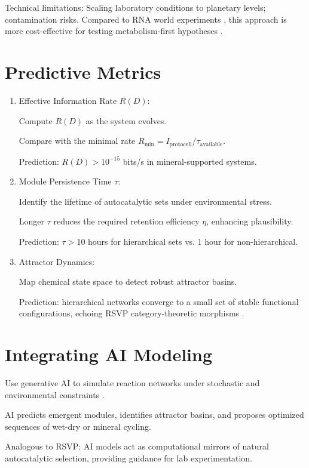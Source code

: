 \documentclass{book}
\begin{document}
Technical limitations: Scaling laboratory conditions to planetary levels; contamination risks. Compared to RNA world experiments \citep{joyce2012}, this approach is more cost-effective for testing metabolism-first hypotheses \citep{martin2015}.

\section{Predictive Metrics}
\begin{enumerate}
\item Effective Information Rate $R(D)$:

Compute $R(D)$ as the system evolves.

Compare with the minimal rate $R_{\min} = I_{\text{protocell}} / \tau_{\text{available}}$.

Prediction: $R(D) > 10^{-15}$ bits/s in mineral-supported systems.

\item Module Persistence Time $\tau$:

Identify the lifetime of autocatalytic sets under environmental stress.

Longer $\tau$ reduces the required retention efficiency $\eta$, enhancing plausibility.

Prediction: $\tau > 10$ hours for hierarchical sets vs. 1 hour for non-hierarchical.

\item Attractor Dynamics:

Map chemical state space to detect robust attractor basins.

Prediction: hierarchical networks converge to a small set of stable functional configurations, echoing RSVP category-theoretic morphisms \citep{peng2020}.
\end{enumerate}

\section{Integrating AI Modeling}
Use generative AI to simulate reaction networks under stochastic and environmental constraints \citep{scalinghypothesis}.

AI predicts emergent modules, identifies attractor basins, and proposes optimized sequences of wet-dry or mineral cycling.

Analogous to RSVP: AI models act as computational mirrors of natural autocatalytic selection, providing guidance for lab experimentation.
\end{document}
